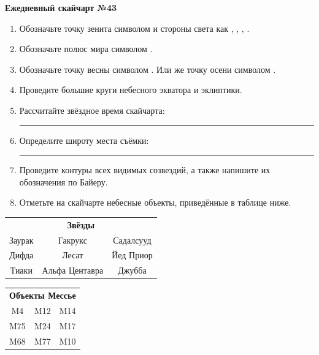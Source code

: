 \documentclass{./SAS-class-skygen}
\begin{document}
    
    
    
	\begin{center}
		\large\textbf{Ежедневный скайчарт №43}
	\end{center}

	\begin{enumerate}
		\item Обозначьте точку зенита символом  и стороны света как , , , .
		\item Обозначьте полюс мира символом .
		\item Обозначьте точку весны символом \Aries. Или же точку осени символом \Libra.
		\item Проведите большие круги небесного экватора и эклиптики.
		\item Рассчитайте звёздное время скайчарта: \rule{2cm}{0.4pt}
		\item Определите широту места съёмки: \rule{2cm}{0.4pt}
		\item Проведите контуры всех видимых созвездий, а также напишите их обозначения по Байеру.
		\item Отметьте на скайчарте небесные объекты, приведённые в таблице ниже.
	\end{enumerate}
	
    \vspace{0.5cm}

    \begin{table}[h!]
    \centering
    \begin{tabular}{ccc}
    \multicolumn{3}{c}{\textbf{Звёзды}} \\ Заурак & Гакрукс & Садалсууд \\
Дифда & Лесат & Йед Приор \\
Тиаки & Альфа Центавра & Джубба \\

\end{tabular}
    \hfill
    \begin{tabular}{ccc}
    \multicolumn{3}{c}{\textbf{Объекты Мессье}} \\ M4 & M12 & M14 \\
M75 & M24 & M17 \\
M68 & M77 & M10 \\

\end{tabular}
    \end{table}
	
\end{document}
